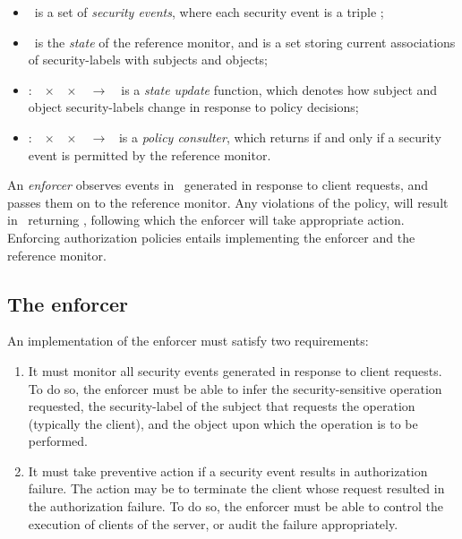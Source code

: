 \begin{itemize}
%
\item \events\ is a set of \textit{security events}, where each security event
is a triple ;
%
\item \state\ is the \textit{state} of the reference monitor, and is a set
storing current associations of security-labels with subjects and objects;
%
\item \update:~\events~$\times$~\state~$\times$~\policy~$\rightarrow$~\state\
is a \textit{state update} function, which denotes how subject and object
security-labels change in response to policy decisions;
%
\item
\return:~\events~$\times$~\state~$\times$~\policy~$\rightarrow$~ is
a \textit{policy consulter}, which returns \pred{True} if and only if a
security event is permitted by the reference monitor.  
%
\end{itemize}

An \textit{enforcer} observes events in \events\ generated in response to
client requests, and passes them on to the reference monitor. Any violations of
the policy, will result in \return\ returning \pred{False}, following which the
enforcer will take appropriate action.  Enforcing authorization policies
entails implementing the enforcer and the reference monitor. 


\subsection{The enforcer} 
\label{chapter:overview:basictools:enforcer}
%
An implementation of the enforcer must satisfy two requirements:

\begin{enumerate}
%
\item It must monitor all security events generated in response to client
requests.  To do so, the enforcer must be able to infer the security-sensitive
operation requested, the security-label of the subject that requests the
operation (typically the client), and the object upon which the operation is to
be performed. 
%
\item It must take preventive action if a security event results in
authorization failure. The action may be to terminate the client whose request
resulted in the authorization failure.  To do so, the enforcer must be able to
control the execution of clients of the server, or audit the failure
appropriately.
%
\end{enumerate}

